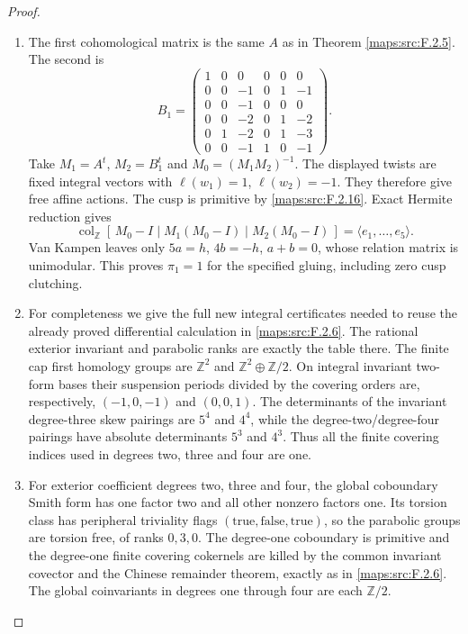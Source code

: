 \begin{proof}
\begin{enumerate}[label=\arabic*.]
\item The first cohomological matrix is the same $A$ as in
Theorem \ref{maps:src:F.2.5}.  The second is
\[
 B_1=\begin{pmatrix}
 1&0&0&0&0&0\\
 0&0&-1&0&1&-1\\
 0&0&-1&0&0&0\\
 0&0&-2&0&1&-2\\
 0&1&-2&0&1&-3\\
 0&0&-1&1&0&-1
 \end{pmatrix}.
 \tag{F.U11}\label{maps:eq:F.U11}
\]
Take $M_1=A^t$, $M_2=B_1^t$ and
$M_0=(M_1M_2)^{-1}$.  The displayed twists are fixed integral
vectors with $\ell(w_1)=1$, $\ell(w_2)=-1$.
They therefore give free affine actions.  The cusp is
primitive by \ref{maps:src:F.2.16}.  Exact Hermite reduction gives
\[
 \operatorname{col}_{\mathbb Z}
 [\,M_0-I\mid M_1(M_0-I)\mid M_2(M_0-I)\,]
       =\langle e_1,\ldots,e_5\rangle.
\]
Van Kampen leaves only $5a=h$, $4b=-h$, $a+b=0$,
whose relation matrix is unimodular.  This proves
$\pi_1=1$ for the specified gluing, including zero cusp
clutching.

\item For completeness we give the full new integral certificates
needed to reuse the already proved differential calculation
in \ref{maps:src:F.2.6}.  The rational exterior invariant and parabolic ranks
are exactly the table there.  The finite cap first homology
groups are $\mathbb Z^2$ and $\mathbb Z^2\oplus\mathbb Z/2$.
On integral invariant two-form bases their suspension periods
divided by the covering orders are, respectively,
$(-1,0,-1)$ and $(0,0,1)$.  The determinants of the invariant
degree-three skew pairings are $5^4$ and $4^4$, while the
degree-two/degree-four pairings have absolute determinants
$5^3$ and $4^3$.  Thus all the finite covering indices used
in degrees two, three and four are one.

\item For exterior coefficient degrees two, three and four, the
global coboundary Smith form has one factor two and all other
nonzero factors one.  Its torsion class has peripheral
triviality flags $(\mathrm{true},\mathrm{false},\mathrm{true})$,
so the parabolic groups are torsion free, of ranks $0,3,0$.
The degree-one coboundary is primitive and the degree-one
finite covering cokernels are killed by the common invariant
covector and the Chinese remainder theorem, exactly as in
\ref{maps:src:F.2.6}.  The global coinvariants in degrees one through four
are each $\mathbb Z/2$.


\end{enumerate}
\end{proof}
